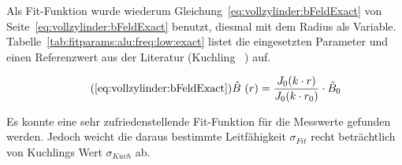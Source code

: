 {\begin{minipage}[t]{0.33\textwidth}
\begin{minipage}[t]{0.5\textwidth}
\begin{center}
            \end{center}
        \end{minipage}%
        \begin{minipage}[t]{0.5\textwidth}
            \vspace{0mm}
            Als             Fit-Funktion            wurde             wiederum
            Gleichung~\ref{eq:vollzylinder:bFeldExact}                     von
            Seite~\ref{eq:vollzylinder:bFeldExact}       benutzt,      diesmal
            mit           dem          Radius           als          Variable.
            Tabelle~\ref{tab:fitparams:alu:freq:low:exact}      listet     die
            eingesetzten Parameter  und einen  Referenzwert aus  der Literatur
            (Kuchling ~\cite{ref:kuchling:resistivityTable}) auf.

            \begin{equation}
                \tag{\ref{eq:vollzylinder:bFeldExact}}
                \hat{B}~(r) = \frac{J_0 (k \cdot r)}{J_0 (k \cdot r_0)} \cdot \hat{B}_0
            \end{equation}

            Es  konnte eine  sehr  zufriedenstellende  Fit-Funktion f\"ur  die
            Messwerte  gefunden  werden. Jedoch  weicht die  daraus  bestimmte
            Leitf\"ahigkeit $\sigma_{Fit}$ recht betr\"achtlich von  Kuchlings
            Wert $\sigma_{Kuch}$ ab.
        \end{minipage}%

        \vspace{1em}
        \begin{minipage}[c][][b]{0.5\textwidth}
            \vspace{0pt}
            
        \end{minipage}%
        \begin{minipage}[c][][b]{0.5\textwidth}
            \resizebox{\textwidth}{!}{}
            \label{fig:alu:rad:low:sensor}
        \end{minipage}
	\end{minipage}%
	\begin{minipage}[t]{0.67\textwidth}
        \vspace{0mm}
        \hfill
        \resizebox{.95\textwidth}{!}{}
        \label{fig:alu:rad:exact:low}
	\end{minipage}

}
